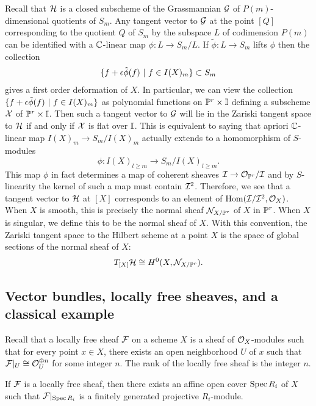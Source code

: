 \documentclass[12pt]{article}
\begin{document}
Recall that $\cH$ is a closed subscheme of the Grassmannian $\cG$ of $P(m)$-dimensional quotients of $S_m$. Any tangent vector to $\cG$ at the point $[Q]$ corresponding to the quotient $Q$ of $S_m$ by the subspace $L$ of codimension $P(m)$ can be identified with a $\C$-linear map $\phi: L \to S_m/L$. If $\tilde\phi: L \to S_m$ lifts $\phi$ then the collection \begin{align*}
    \set{f + \epsilon \tilde\phi(f) \st f \in I(X)_m} \subset S_m
\end{align*} gives a first order deformation of $X$. In particular, we can view the collection $\set{f + \epsilon \tilde\phi(f) \st f \in I(X)_m}$ as polynomial functions on $\P^r\times \bI$ defining a subscheme $\cX$ of $\P^r \times \bI$. Then such a tangent vector to $\cG$ will lie in the Zariski tangent space to $\cH$ if and only if $\cX$ is flat over $\bI$. This is equivalent to saying that apriori $\C$-linear map $I(X)_m \to S_m/I(X)_m$ actually extends to a homomorphism of $S$-modules
\[
    \phi: I(X)_{l\geq m} \to S_m/I(X)_{l\geq m}.
\]
This map $\phi$ in fact determines a map of coherent sheaves $\cI \to \cO_{\P^r}/\cI$ and by $S$-linearity the kernel of such a map must contain $\cI^2$. Therefore, we see that a tangent vector to $\cH$ at $[X]$ corresponds to an element of $\Hom(\cI/\cI^2,\cO_X)$. When $X$ is smooth, this is precisely the normal sheaf $\cN_{X/\P^r}$ of $X$ in $\P^r$. When $X$ is singular, we define this to be the normal sheaf of $X$. With this convention, the Zariski tangent space to the Hilbert scheme at a point $X$ is the space of global sections of the normal sheaf of $X$: \begin{align*}
    T_{[X]}\cH \cong H^0(X,\cN_{X/\P^r}).
\end{align*}

\subsection{Vector bundles, locally free sheaves, and a classical example}
Recall that a locally free sheaf $\cF$ on a scheme $X$ is a sheaf of $\cO_X$-modules such that for every point $x \in X$, there exists an open neighborhood $U$ of $x$ such that $\cF|_U \cong \cO_U^{\oplus n}$ for some integer $n$. The rank of the locally free sheaf is the integer $n$.

If $\cF$ is a locally free sheaf, then there exists an affine open cover $\Spec R_i$ of $X$ such that $\cF|_{\Spec R_i} $ is a finitely generated projective $R_i$-module.
\end{document}
